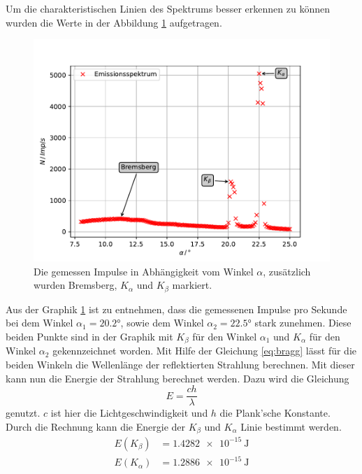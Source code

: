 Um die charakteristischen Linien des Spektrums besser erkennen zu können wurden die Werte in der Abbildung \ref{fig:emission} aufgetragen.
\begin{figure}
  \centering
  \includegraphics[width=\textwidth]{content/data/Emission.pdf}
  \caption{Die gemessen Impulse in Abhängigkeit vom Winkel $\alpha$, zusätzlich wurden Bremsberg, $K_\alpha$ und $K_\beta$ markiert.}
  \label{fig:emission}
\end{figure}

Aus der Graphik \ref{fig:emission} ist zu entnehmen, dass die gemessenen Impulse pro Sekunde bei dem Winkel $\alpha_1 = 20.2 \si{\degree}$, sowie dem Winkel $\alpha_2 = 22.5 \si{\degree}$ stark zunehmen.
Diese beiden Punkte sind in der Graphik mit $K_\beta$ für den Winkel $\alpha_1$ und $K_\alpha$ für den Winkel $\alpha_2$ gekennzeichnet worden.
Mit Hilfe der Gleichung \eqref{eq:bragg} lässt für die beiden Winkeln die Wellenlänge der reflektierten Strahlung berechnen.
Mit dieser kann nun die Energie der Strahlung berechnet werden.
Dazu wird die Gleichung
\begin{equation}
  E = \frac{ch}{\lambda}
  \label{eq:energie}
\end{equation}
genutzt.
$c$ ist hier die Lichtgeschwindigkeit und $h$ die Plank'sche Konstante.
Durch die Rechnung kann die Energie der $K_\beta$ und $K_\alpha$ Linie bestimmt werden.
\begin{align*}
  E(K_\beta) & = \SI{1.4282e-15}{\joule}\\
  E(K_\alpha) &= \SI{1.2886e-15}{\joule}\\
\end{align*}

